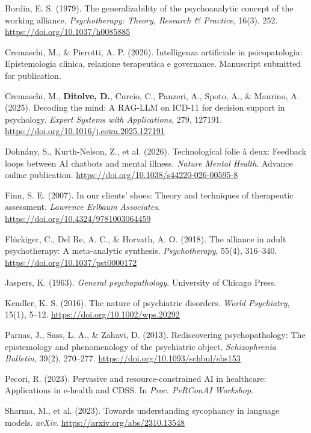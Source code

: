 \documentclass[11pt,a4paper]{article}
\begin{document}
\begin{enumerate}[label={[\arabic*]}]
    \item Bordin, E. S. (1979). The generalizability of the psychoanalytic concept of the working alliance. \textit{Psychotherapy: Theory, Research \& Practice}, 16(3), 252. \url{https://doi.org/10.1037/h0085885}
    \item Cremaschi, M., \& Pierotti, A. P. (2026). Intelligenza artificiale in psicopatologia: Epistemologia clinica, relazione terapeutica e governance. Manuscript submitted for publication.
    \item Cremaschi, M., \textbf{Ditolve, D.}, Curcio, C., Panzeri, A., Spoto, A., \& Maurino, A. (2025). Decoding the mind: A RAG-LLM on ICD-11 for decision support in psychology. \textit{Expert Systems with Applications}, 279, 127191. \url{https://doi.org/10.1016/j.eswa.2025.127191}
    \item Dohnány, S., Kurth-Nelson, Z., et al. (2026). Technological folie à deux: Feedback loops between AI chatbots and mental illness. \textit{Nature Mental Health}. Advance online publication. \url{https://doi.org/10.1038/s44220-026-00595-8}
    \item Finn, S. E. (2007). In our clients' shoes: Theory and techniques of therapeutic assessment. \textit{Lawrence Erlbaum Associates}. \url{https://doi.org/10.4324/9781003064459}
    \item Flückiger, C., Del Re, A. C., \& Horvath, A. O. (2018). The alliance in adult psychotherapy: A meta-analytic synthesis. \textit{Psychotherapy}, 55(4), 316--340. \url{https://doi.org/10.1037/pst0000172}
    \item Jaspers, K. (1963). \textit{General psychopathology}. University of Chicago Press.
    \item Kendler, K. S. (2016). The nature of psychiatric disorders. \textit{World Psychiatry}, 15(1), 5--12. \url{https://doi.org/10.1002/wps.20292}
    \item Parnas, J., Sass, L. A., \& Zahavi, D. (2013). Rediscovering psychopathology: The epistemology and phenomenology of the psychiatric object. \textit{Schizophrenia Bulletin}, 39(2), 270--277. \url{https://doi.org/10.1093/schbul/sbs153}
    \item Pecori, R. (2023). Pervasive and resource-constrained AI in healthcare: Applications in e-health and CDSS. In \textit{Proc. PeRConAI Workshop}.
    \item Sharma, M., et al. (2023). Towards understanding sycophancy in language models. \textit{arXiv}. \url{https://arxiv.org/abs/2310.13548}

\end{enumerate}
\end{document}
